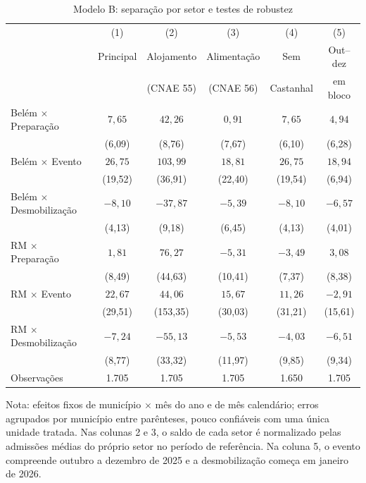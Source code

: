 \documentclass[12pt,a4paper]{article}
\begin{document}
\begin{table}[H]
\centering\small
\begin{threeparttable}
\caption{Modelo B: separação por setor e testes de robustez}\label{tab:rob}
\begin{tabularx}{\linewidth}{Lccccc}
\toprule
 & (1) & (2) & (3) & (4) & (5)\\
 & Principal & Alojamento & Alimentação & Sem & Out--dez\\
 & & (CNAE 55) & (CNAE 56) & Castanhal & em bloco\\
\midrule
Belém $\times$ Preparação & $7{,}65$ & $42{,}26$ & $0{,}91$ & $7{,}65$ & $4{,}94$\\
 & (6,09) & (8,76) & (7,67) & (6,10) & (6,28)\\
Belém $\times$ Evento & $26{,}75$ & $103{,}99$ & $18{,}81$ & $26{,}75$ & $18{,}94$\\
 & (19,52) & (36,91) & (22,40) & (19,54) & (6,94)\\
Belém $\times$ Desmobilização & $-8{,}10$ & $-37{,}87$ & $-5{,}39$ & $-8{,}10$ & $-6{,}57$\\
 & (4,13) & (9,18) & (6,45) & (4,13) & (4,01)\\
RM $\times$ Preparação & $1{,}81$ & $76{,}27$ & $-5{,}31$ & $-3{,}49$ & $3{,}08$\\
 & (8,49) & (44,63) & (10,41) & (7,37) & (8,38)\\
RM $\times$ Evento & $22{,}67$ & $44{,}06$ & $15{,}67$ & $11{,}26$ & $-2{,}91$\\
 & (29,51) & (153,35) & (30,03) & (31,21) & (15,61)\\
RM $\times$ Desmobilização & $-7{,}24$ & $-55{,}13$ & $-5{,}53$ & $-4{,}03$ & $-6{,}51$\\
 & (8,77) & (33,32) & (11,97) & (9,85) & (9,34)\\
\midrule
Observações & 1.705 & 1.705 & 1.705 & 1.650 & 1.705\\
\bottomrule
\end{tabularx}
\begin{tablenotes}\footnotesize
\item Nota: efeitos fixos de município $\times$ mês do ano e de mês calendário; erros agrupados por
município entre parênteses, pouco confiáveis com uma única unidade tratada. Nas colunas 2 e 3, o saldo
de cada setor é normalizado pelas admissões médias do próprio setor no período de referência. Na
coluna 5, o evento compreende outubro a dezembro de 2025 e a desmobilização começa em janeiro de 2026.
\end{tablenotes}
\end{threeparttable}
\end{table}
\end{document}
